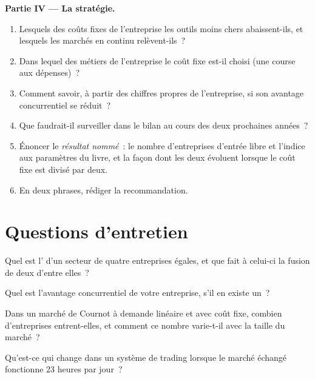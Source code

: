 \begin{problem}
\medskip\noindent\textbf{Partie IV --- La stratégie.}
\begin{enumerate}[resume]
\item Lesquels des coûts fixes de l'entreprise les outils moins chers abaissent-ils, et lesquels les marchés en continu relèvent-ils~?
\item Dans lequel des métiers de l'entreprise le coût fixe est-il choisi (une course aux dépenses)~?
\item Comment savoir, à partir des chiffres propres de l'entreprise, si son avantage concurrentiel se réduit~?
\item Que faudrait-il surveiller dans le bilan au cours des deux prochaines années~?
\item Énoncer le \emph{résultat nommé}~: le nombre d'entreprises d'entrée libre et l'indice aux paramètres du livre, et la façon dont les deux évoluent lorsque le coût fixe
est divisé par deux.
\item En deux phrases, rédiger la recommandation.
\end{enumerate}
\end{problem}

\section{Questions d'entretien}

\begin{interviewq}\label{iq:fm:competition-and-the-future:1}
Quel est l' d'un secteur de quatre entreprises égales, et que fait à celui-ci la fusion de deux d'entre elles~?
\end{interviewq}

\begin{interviewq}\label{iq:fm:competition-and-the-future:2}
Quel est l'avantage concurrentiel de votre entreprise, s'il en existe un~?
\end{interviewq}

\begin{interviewq}\label{iq:fm:competition-and-the-future:3}
Dans un marché de Cournot à demande linéaire et avec coût fixe, combien d'entreprises entrent-elles, et comment ce nombre varie-t-il avec la taille du marché~?
\end{interviewq}

\begin{interviewq}\label{iq:fm:competition-and-the-future:4}
Qu'est-ce qui change dans un système de trading lorsque le marché échangé fonctionne 23 heures par jour~?
\end{interviewq}

